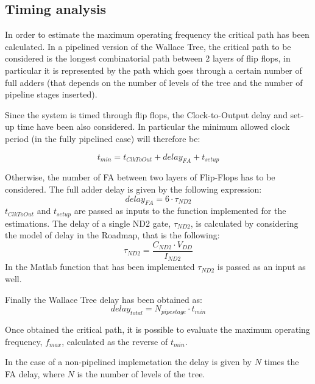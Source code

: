 \subsection{Timing analysis}
In order to estimate the maximum operating frequency the critical path has been calculated. In a pipelined version of the Wallace Tree, the critical path to be considered is the longest combinatorial path between 2 layers of flip flops, in particular it is represented by the path which goes through a certain number of full adders (that depends on the number of levels of the tree and the number of pipeline stages inserted).

Since the system is timed through flip flops, the Clock-to-Output delay and set-up time have been also considered. In particular the minimum allowed clock period (in the fully pipelined case) will therefore be:

\begin{equation}
t_{min}=t_{ClkToOut}+delay_{FA}+t_{setup}
\end{equation}

Otherwise, the number of FA between two layers of Flip-Flops has to be considered. The full adder delay is given by the following expression:
\begin{equation}
delay_{FA}=6\cdot\tau_{ND2}
\end{equation}
$t_{ClkToOut}$ and $t_{setup}$ are passed as inputs to the function implemented for the estimations.
The delay of a single ND2 gate, $\tau_{ND2}$, is calculated by considering the model of delay in the Roadmap, that is the following:
\begin{equation}
\tau_{ND2}=\frac{C_{ND2}\cdot V_{DD}}{I_{ND2}}
\end{equation}
In the Matlab function that has been implemented $\tau_{ND2}$ is passed as an input as well.

Finally the Wallace Tree delay has been obtained as:
\begin{equation}
delay_{total}=N_{pipestage}\cdot t_{min}
\end{equation}

Once obtained the critical path, it is possible to evaluate the maximum operating frequency, $f_{max}$, calculated as the reverse of $t_{min}$. 

In the case of a non-pipelined implemetation the delay is given by $N$ times the FA delay, where $N$ is the number of levels of the tree.